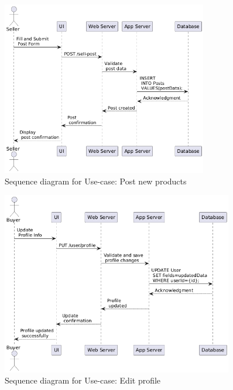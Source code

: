 \begin{figure}[!h]
	\centering
	\includegraphics[width=0.8\textwidth]{chapters/ch-04/303_usecase_post.png} %
	\caption{Sequence diagram for Use-case: Post new products}
	\label{fig:seq_04} %
\end{figure}

\begin{figure}[!h]
	\centering
	\includegraphics[width=0.9\textwidth]{chapters/ch-04/304_usecase_edit_profile.png} %
	\caption{Sequence diagram for Use-case: Edit profile}
	\label{fig:seq_05} %
\end{figure}

